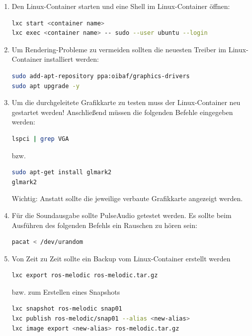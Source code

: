 \begin{enumerate}[label*=\arabic*.]
    \item Den Linux-Container starten und eine Shell im Linux-Container öffnen:
        \begin{lstlisting}[language=bash]
lxc start <container name>
lxc exec <container name> -- sudo --user ubuntu --login
        \end{lstlisting}

    \item Um Rendering-Probleme zu vermeiden sollten die neuesten Treiber im Linux-Container installiert werden:
        \begin{lstlisting}[language=bash]
sudo add-apt-repository ppa:oibaf/graphics-drivers
sudo apt upgrade -y
        \end{lstlisting}

    \item Um die durchgeleitete Grafikkarte zu testen muss der Linux-Container neu gestartet werden! Anschließend müssen die folgenden Befehle eingegeben werden:
        \begin{lstlisting}[language=bash]
lspci | grep VGA
        \end{lstlisting}
        bzw.
        \begin{lstlisting}[language=bash]
sudo apt-get install glmark2
glmark2
        \end{lstlisting}

        \begin{redbox}{Wichtig:}
            Anstatt  sollte die jeweilige verbaute Grafikkarte angezeigt werden.
        \end{redbox}

    \item Für die Soundausgabe sollte PulseAudio getestet werden. Es sollte beim Ausführen des folgenden Befehls ein Rauschen zu hören sein:
        \begin{lstlisting}[language=bash]
pacat < /dev/urandom
        \end{lstlisting}

    \item Von Zeit zu Zeit sollte ein Backup vom Linux-Container erstellt werden
        \begin{lstlisting}[language=bash]
lxc export ros-melodic ros-melodic.tar.gz
        \end{lstlisting}

        bzw. zum Erstellen eines Snapshots

        \begin{lstlisting}[language=bash]
lxc snapshot ros-melodic snap01
lxc publish ros-melodic/snap01 --alias <new-alias>
lxc image export <new-alias> ros-melodic.tar.gz
        \end{lstlisting}


\end{enumerate}
